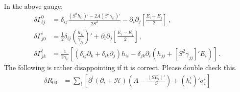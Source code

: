 \documentclass{article}
\newcommand*\scr[1]{\mathscr{#1}}
\newcommand*\p[1]{\left(#1\right)}
\newcommand*\ps[1]{\left[#1\right]}
\newcommand*\f[2]{\frac{#1}{#2}}
\begin{document}
In the above gauge:
\begin{align}
\delta\Gamma^0_{ij}&=\delta_{ij}\f{\p{S^2 h_{ii}}'-2A\p{S^2\gamma_{ii}}'}{2S^2}-\partial_i\partial_j\ps{\f{E_i+E_j}{2}}\,,\\
\delta\Gamma^i_{j0}&=\f12\delta_{ij}\p{\f{h_{jj}}{\gamma_{jj}}}'+\partial_i\partial_j\ps{\f{E_i-E_j}{2}}\,,\\
\delta\Gamma^i_{jk}&=\f{1}{2\gamma_{ii}}\ps{\p{\delta_{ij}\partial_k+\delta_{ik}\partial_j}h_{ii}-\delta_{jk}\partial_i\p{h_{jj}+\ps{S^2\gamma_{jj}}'E_i}}\,.
\end{align}
The following is rather disappointing if it is correct. Please double check this.
\begin{align}
\delta R_{00}&=\sum_i\ps{\partial^i(\partial_i+\scr H)\p{A-\f{(SE_i)'}{S}}+(h^i_i)'\sigma^i_i}
\end{align}
\end{document}
